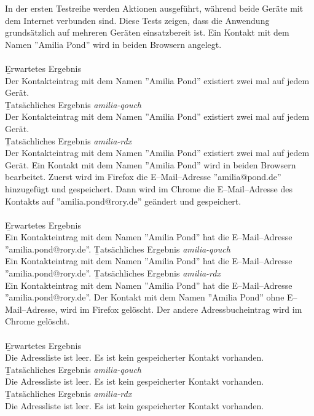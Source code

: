 In der ersten Testreihe werden Aktionen ausgeführt, während beide Geräte mit dem Internet verbunden sind.
Diese Tests zeigen, dass die Anwendung grundsätzlich auf mehreren Geräten einsatzbereit ist.
%
Ein Kontakt mit dem Namen ''Amilia Pond'' wird in beiden Browsern angelegt.\\\\
\b{Erwartetes Ergebnis}\\
Der Kontakteintrag mit dem Namen ''Amilia Pond'' existiert zwei mal auf jedem Gerät.\\
\b{Tatsächliches Ergebnis \it{amilia-qouch}}\\
Der Kontakteintrag mit dem Namen ''Amilia Pond'' existiert zwei mal auf jedem Gerät.\\
\b{Tatsächliches Ergebnis \it{amilia-rdx}}\\
Der Kontakteintrag mit dem Namen ''Amilia Pond'' existiert zwei mal auf jedem Gerät.
%
Ein Kontakt mit dem Namen ''Amilia Pond'' wird in beiden Browsern bearbeitet.
Zuerst wird im Firefox die E--Mail--Adresse ''amilia@pond.de'' hinzugefügt und gespeichert.
Dann wird im Chrome die E--Mail--Adresse des Kontakts auf ''amilia.pond@rory.de'' geändert und gespeichert.\\\\
\b{Erwartetes Ergebnis}\\
Ein Kontakteintrag mit dem Namen ''Amilia Pond'' hat die E--Mail--Adresse ''amilia.pond@rory.de''.
\b{Tatsächliches Ergebnis \it{amilia-qouch}}\\
Ein Kontakteintrag mit dem Namen ''Amilia Pond'' hat die E--Mail--Adresse ''amilia.pond@rory.de''.
\b{Tatsächliches Ergebnis \it{amilia-rdx}}\\
Ein Kontakteintrag mit dem Namen ''Amilia Pond'' hat die E--Mail--Adresse ''amilia.pond@rory.de''.
%
Der Kontakt mit dem Namen ''Amilia Pond'' ohne E--Mail--Adresse, wird im Firefox gelöscht. Der andere Adressbucheintrag wird im Chrome gelöscht.\\\\
\b{Erwartetes Ergebnis}\\
Die Adressliste ist leer. Es ist kein gespeicherter Kontakt vorhanden.\\
\b{Tatsächliches Ergebnis \it{amilia-qouch}}\\
Die Adressliste ist leer. Es ist kein gespeicherter Kontakt vorhanden.\\
\b{Tatsächliches Ergebnis \it{amilia-rdx}}\\
Die Adressliste ist leer. Es ist kein gespeicherter Kontakt vorhanden.
